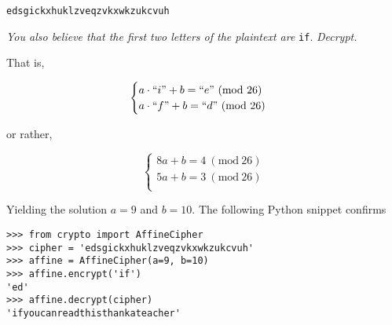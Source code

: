 \documentclass[12pt]{article}
\renewcommand{\mod}[1]{\mathrm{mod}\ #1}
\renewcommand{\pmod}[1]{\ (\mod{#1})}
\begin{document}
\begin{center}
\texttt{edsgickxhuklzveqzvkxwkzukcvuh}
\end{center}

\noindent\textit{You also believe that the first two letters of the plaintext are} \texttt{if}. \textit{Decrypt.}

That is,

$$\begin{cases}
a \cdot ``i" + b = ``e" \pmod{26}\\
a \cdot ``f" + b = ``d" \pmod{26}\\
\end{cases}$$

or rather,

$$\begin{cases}
8a + b = 4 \pmod{26}\\
5a + b = 3 \pmod{26}\\
\end{cases}$$

Yielding the solution $a = 9$ and $b = 10$. The following Python snippet confirms

\begin{verbatim}
>>> from crypto import AffineCipher
>>> cipher = 'edsgickxhuklzveqzvkxwkzukcvuh'
>>> affine = AffineCipher(a=9, b=10)
>>> affine.encrypt('if')
'ed'
>>> affine.decrypt(cipher)
'ifyoucanreadthisthankateacher'
\end{verbatim}
\end{document}
